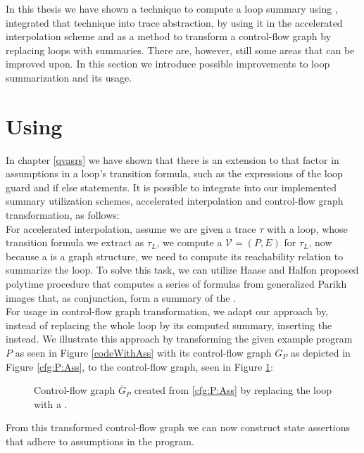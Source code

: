 
In this thesis we have shown a technique to compute a loop summary using \qvasr, integrated that technique into trace abstraction, by using it in the accelerated interpolation scheme and as a method to transform a control-flow graph by replacing loops with summaries. There are, however, still some areas that can be improved upon. In this section we introduce possible improvements to \qvasr loop summarization and its usage.
\section{Using \qvasrs}
In chapter \ref{qvasrs} we have shown that there is an extension to \qvasr that factor in assumptions in a loop's transition formula, such as the expressions of the loop guard and if else statements. It is possible to integrate \qvasrs into our implemented summary utilization schemes, accelerated interpolation and control-flow graph transformation, as follows: \\
For accelerated interpolation, assume we are given a trace $\tau$ with a loop, whose transition formula we extract as $\tau_L$, we compute a \qvasrs $\mathcal{V} = (P, E)$ for $\tau_L$, now because a \qvasrs is a graph structure, we need to compute its reachability relation to summarize the loop. To solve this task, we can utilize Haase and Halfon \cite{DBLP:conf/rp/HaaseH14} proposed polytime procedure that computes a series of formulas from generalized Parikh images that, as conjunction, form a summary of the \qvasrs. \\
For \qvasrs usage in control-flow graph transformation, we adapt our approach by, instead of replacing the whole loop by its computed summary, inserting the \qvasrs instead. We illustrate this approach by transforming the given example program $P$ as seen in Figure \ref{codeWithAss} with its control-flow graph $G_P$ as depicted in Figure \ref{cfg:P:Ass}, to the control-flow graph, seen in Figure \ref{qvasrs_cfg}:
\begin{figure}[H]
	
	\caption{Control-flow graph $\bar{G}_P$ created from \ref{cfg:P:Ass} by replacing the loop with a \qvasrs.}
	\label{qvasrs_cfg}
\end{figure}
From this transformed control-flow graph we can now construct state assertions that adhere to assumptions in the program.
